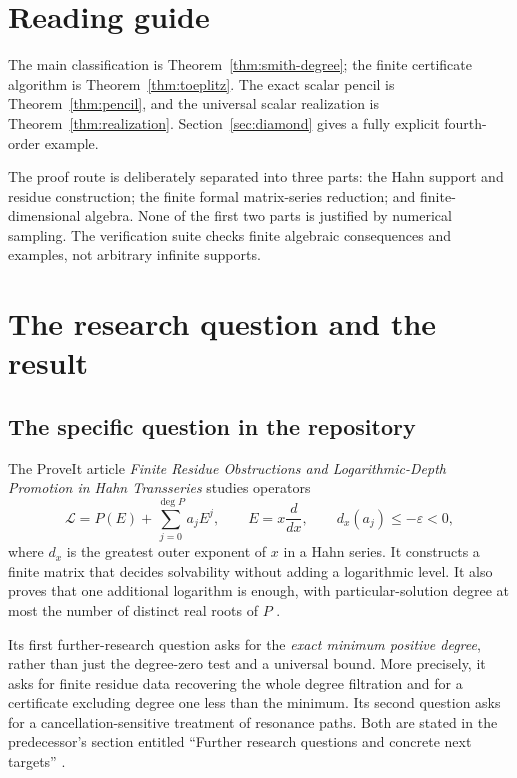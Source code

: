 \documentclass[11pt,a4paper]{article}
\numberwithin{equation}{section}
\theoremstyle{definition}
\theoremstyle{remark}
\theoremstyle{definition}
\newcommand{\Ll}{\mathcal L}
\newcommand{\dx}{d_x}
\newcommand{\eps}{\varepsilon}
\begin{document}
\section*{Reading guide}
The main classification is Theorem~\ref{thm:smith-degree}; the finite certificate algorithm is Theorem~\ref{thm:toeplitz}. The exact scalar pencil is Theorem~\ref{thm:pencil}, and the universal scalar realization is Theorem~\ref{thm:realization}. Section~\ref{sec:diamond} gives a fully explicit fourth-order example.

The proof route is deliberately separated into three parts: the Hahn support and residue construction; the finite formal matrix-series reduction; and finite-dimensional algebra. None of the first two parts is justified by numerical sampling. The verification suite checks finite algebraic consequences and examples, not arbitrary infinite supports.
\clearpage

\section{The research question and the result}
\label{sec:intro}

\subsection{The specific question in the repository}
The ProveIt article \emph{Finite Residue Obstructions and Logarithmic-Depth Promotion in Hahn Transseries} studies operators
\begin{equation}
 \Ll=P(E)+\sum_{j=0}^{\deg P}a_jE^j,
 \qquad E=x\frac{d}{dx},\qquad \dx(a_j)\le-\eps<0,
 \label{eq:class-intro}
\end{equation}
where $\dx$ is the greatest outer exponent of $x$ in a Hahn series. It constructs a finite matrix that decides solvability without adding a logarithmic level. It also proves that one additional logarithm is enough, with particular-solution degree at most the number of distinct real roots of $P$ \cite{repo-residue}.

Its first further-research question asks for the \emph{exact minimum positive degree}, rather than just the degree-zero test and a universal bound. More precisely, it asks for finite residue data recovering the whole degree filtration and for a certificate excluding degree one less than the minimum. Its second question asks for a cancellation-sensitive treatment of resonance paths. Both are stated in the predecessor's section entitled ``Further research questions and concrete next targets'' \cite{repo-residue}.
\end{document}
